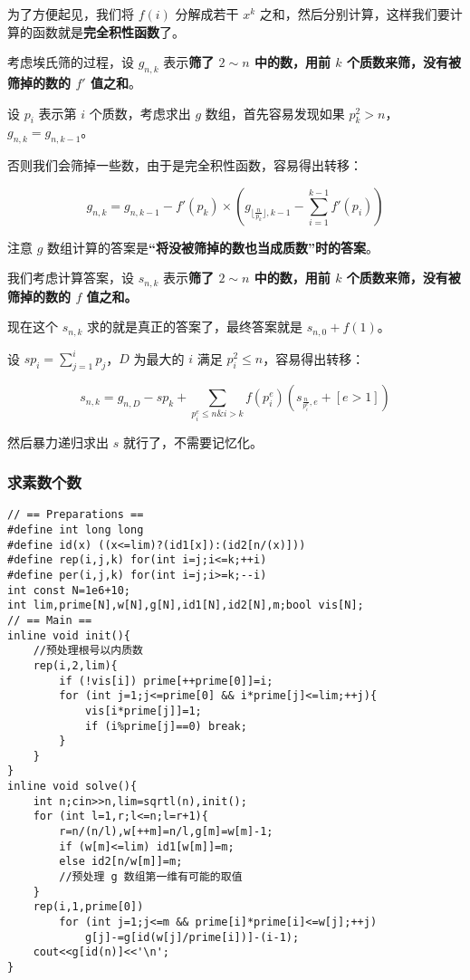 为了方便起见，我们将 $f(i)$ 分解成若干 $x^k$ 之和，然后分别计算，这样我们要计算的函数就是\textbf{完全积性函数}了。

考虑埃氏筛的过程，设 $g_{n,k}$ 表示\textbf{筛了 $2 \sim n$ 中的数，用前 $k$ 个质数来筛，没有被筛掉的数的 $f'$ 值之和}。

设 $p_i$ 表示第 $i$ 个质数，考虑求出 $g$ 数组，首先容易发现如果 $p_k^2 > n$，$g_{n,k}=g_{n,k-1}$。

否则我们会筛掉一些数，由于是完全积性函数，容易得出转移：

$$g_{n,k}=g_{n,k-1}-f'(p_k) \times (g_{\lfloor \frac{n}{p_k} \rfloor,k-1}-\sum_{i=1}^{k-1}f'(p_i))$$

注意 $g$ 数组计算的答案是\textbf{“将没被筛掉的数也当成质数”时的答案}。

我们考虑计算答案，设 $s_{n,k}$ 表示\textbf{筛了 $2 \sim n$ 中的数，用前 $k$ 个质数来筛，没有被筛掉的数的 $f$ 值之和。}

现在这个 $s_{n,k}$ 求的就是真正的答案了，最终答案就是 $s_{n,0}+f(1)$。

设 $sp_i=\sum_{j=1}^i p_j$，$D$ 为最大的 $i$ 满足 $p_i^2 \le n$，容易得出转移：

$$s_{n,k}=g_{n,D}-sp_{k}+\sum_{p_i^e \le n \& i>k} f({p_i^e})(s_{\frac{n}{p_i^e},e}+[e>1])$$

然后暴力递归求出 $s$ 就行了，不需要记忆化。

\subsubsection{求素数个数}

\begin{verbatim}
// == Preparations ==
#define int long long
#define id(x) ((x<=lim)?(id1[x]):(id2[n/(x)]))
#define rep(i,j,k) for(int i=j;i<=k;++i)
#define per(i,j,k) for(int i=j;i>=k;--i)
int const N=1e6+10;
int lim,prime[N],w[N],g[N],id1[N],id2[N],m;bool vis[N];
// == Main ==
inline void init(){
    //预处理根号以内质数
    rep(i,2,lim){
        if (!vis[i]) prime[++prime[0]]=i;
        for (int j=1;j<=prime[0] && i*prime[j]<=lim;++j){
            vis[i*prime[j]]=1;
            if (i%prime[j]==0) break;
        }
    }
}
inline void solve(){
    int n;cin>>n,lim=sqrtl(n),init();
    for (int l=1,r;l<=n;l=r+1){
        r=n/(n/l),w[++m]=n/l,g[m]=w[m]-1;
        if (w[m]<=lim) id1[w[m]]=m;
        else id2[n/w[m]]=m;
        //预处理 g 数组第一维有可能的取值
    }
    rep(i,1,prime[0])
        for (int j=1;j<=m && prime[i]*prime[i]<=w[j];++j)
            g[j]-=g[id(w[j]/prime[i])]-(i-1);
    cout<<g[id(n)]<<'\n';
}
\end{verbatim}

